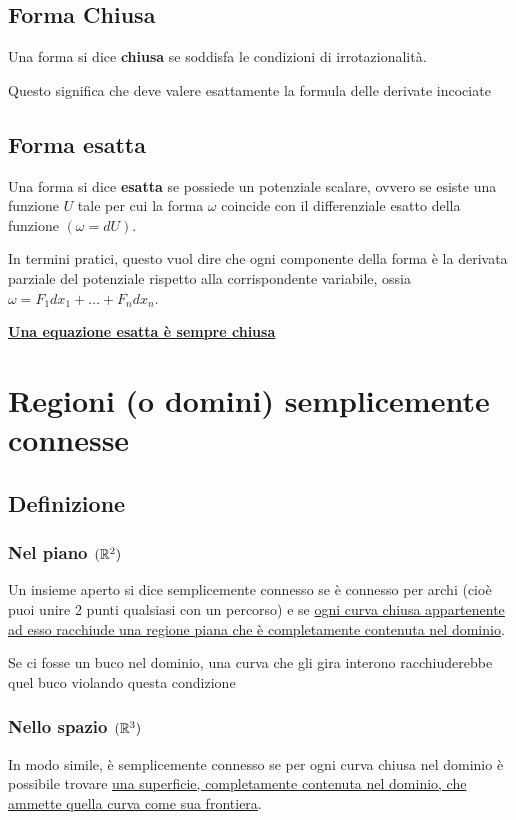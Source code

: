 \subsection{Forma Chiusa}
Una forma si dice \textbf{chiusa} se soddisfa le condizioni di irrotazionalità.

Questo significa che deve valere esattamente la formula delle derivate incociate

\subsection{Forma esatta}
Una forma si dice \textbf{esatta} se possiede un potenziale scalare, ovvero se esiste una funzione $U$ tale per cui la forma $\omega$ coincide con il differenziale esatto della funzione $(\omega = dU)$.

In termini pratici, questo vuol dire che ogni componente della forma è la derivata parziale del potenziale rispetto alla corrispondente variabile, ossia $\omega = F_{1}dx_{1} + \dots + F_{n}dx_{n}$.

\uline{\textbf{Una equazione esatta è sempre chiusa}}

\section{Regioni (o domini) semplicemente connesse}
\subsection{Definizione}
\subsubsection{Nel piano $(\mathbb{R}^2)$}
Un insieme aperto si dice semplicemente connesso se è connesso per archi (cioè puoi unire 2 punti qualsiasi con un percorso) e se \uline{ogni curva chiusa appartenente ad esso racchiude una regione piana che è completamente contenuta nel dominio}.

Se ci fosse un buco nel dominio, una curva che gli gira interono racchiuderebbe quel buco violando questa condizione

\subsubsection{Nello spazio $(\mathbb{R}^3)$}
In modo simile, è semplicemente connesso se per ogni curva chiusa nel dominio è possibile trovare \uline{una superficie, completamente contenuta nel dominio, che ammette quella curva come sua frontiera}.

